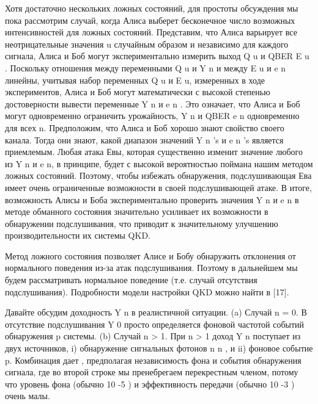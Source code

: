 Хотя достаточно нескольких ложных состояний, для простоты обсуждения мы пока рассмотрим случай, когда Алиса выберет бесконечное число возможных интенсивностей для ложных состояний. Представим, что Алиса варьирует все неотрицательные значения u случайным образом и независимо для каждого сигнала, Алиса и Боб могут экспериментально измерить выход Q u и QBER E u . Поскольку отношения между переменными Q u и Y n и между E u и e n линейны, учитывая набор переменных Q u и E u, измеренных в ходе экспериментов, Алиса и Боб могут математически с высокой степенью достоверности вывести переменные Y n и e n . Это означает, что Алиса и Боб могут одновременно ограничить урожайность, Y n и QBER e n одновременно для всех n. Предположим, что Алиса и Боб хорошо знают свойство своего канала. Тогда они знают, какой диапазон значений Y n 's и e n 's является приемлемым. Любая атака Евы, которая существенно изменит значение любого из Y n и e n, в принципе, будет с высокой вероятностью поймана нашим методом ложных состояний. Поэтому, чтобы избежать обнаружения, подслушивающая Ева имеет очень ограниченные возможности в своей подслушивающей атаке. В итоге, возможность Алисы и Боба экспериментально проверить значения Y n и e n в методе обманного состояния значительно усиливает их возможности в обнаружении подслушивания, что приводит к значительному улучшению производительности их системы QKD.

Метод ложного состояния позволяет Алисе и Бобу обнаружить отклонения от нормального поведения из-за атак подслушивания. Поэтому в дальнейшем мы будем рассматривать нормальное поведение (т.е. случай отсутствия подслушивания). Подробности модели настройки QKD можно найти в [17].

Давайте обсудим доходность Y n в реалистичной ситуации.
(a) Случай n = 0.
В отсутствие подслушивания Y 0 просто определяется фоновой частотой событий обнаружения p системы.
(b) Случай n > 1. При n > 1 доход Y n поступает из двух источников, i) обнаружение сигнальных фотонов n n , и ii) фоновое событие p. Комбинация дает , предполагая независимость фона и события обнаружения сигнала, где во второй строке мы пренебрегаем перекрестным членом, потому что уровень фона (обычно 10 -5 ) и эффективность передачи (обычно 10 -3 ) очень малы.

